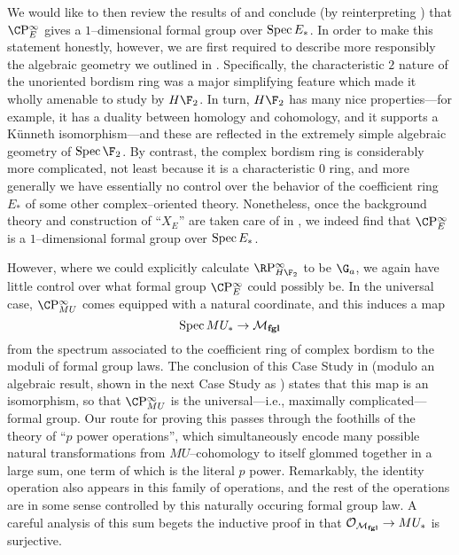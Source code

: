 We would like to then review the results of  and conclude (by reinterpreting ) that $\CP^\infty_E$ gives a $1$--dimensional formal group over $\operatorname{Spec} E_*$.  In order to make this statement honestly, however, we are first required to describe more responsibly the algebraic geometry we outlined in .  Specifically, the characteristic $2$ nature of the unoriented bordism ring was a major simplifying feature which made it wholly amenable to study by $H\F_2$.  In turn, $H\F_2$ has many nice properties---for example, it has a duality between homology and cohomology, and it supports a K\"unneth isomorphism---and these are reflected in the extremely simple algebraic geometry of $\Spec \F_2$.  By contrast, the complex bordism ring is considerably more complicated, not least because it is a characteristic $0$ ring, and more generally we have essentially no control over the behavior of the coefficient ring $E_*$ of some other complex--oriented theory.  Nonetheless, once the background theory and construction of ``$X_E$'' are taken care of in , we indeed find that $\CP^\infty_E$ is a $1$--dimensional formal group over $\operatorname{Spec} E_*$.

However, where we could explicitly calculate $\RP^\infty_{H\F_2}$ to be $\G_a$, we again have little control over what formal group $\CP^\infty_E$ could possibly be.  In the universal case, $\CP^\infty_{MU}$ comes equipped with a natural coordinate, and this induces a map \[\operatorname{Spec} MU_* \to \mathcal{M}_{\mathbf{fgl}}\] from the spectrum associated to the coefficient ring of complex bordism to the moduli of formal group laws.  The conclusion of this Case Study in  (modulo an algebraic result, shown in the next Case Study as ) states that this map is an isomorphism, so that $\CP^\infty_{MU}$ is the universal---i.e., maximally complicated---formal group.  Our route for proving this passes through the foothills of the theory of ``$p${\th} power operations'', which simultaneously encode many possible natural transformations from $MU$--cohomology to itself glommed together in a large sum, one term of which is the literal $p${\th} power.  Remarkably, the identity operation also appears in this family of operations, and the rest of the operations are in some sense controlled by this naturally occuring formal group law.  A careful analysis of this sum begets the inductive proof in  that $\mathcal{O}_{\mathcal{M}_{\mathbf{fgl}}} \to MU_*$ is surjective.

